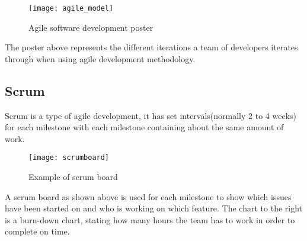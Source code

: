 \begin{figure}[!htpb]
\centering
	\texttt{[image: agile\_model]}
\caption{Agile software development poster}
\label{logo}
\end{figure}

The poster above represents the different iterations a team of developers iterates through when using agile development methodology.

\subsection{Scrum}
Scrum is a type of agile development, it has set intervals(normally 2 to 4 weeks) for each milestone with each milestone containing about the same amount of work.

\begin{figure}[!htpb]
\centering
	\texttt{[image: scrumboard]}
\caption{Example of scrum board}
\label{logo}
\end{figure}

A scrum board as shown above is used for each milestone to show which issues have been started on and who is working on which feature. The chart to the right is a burn-down chart, stating how many hours the team has to work in order to complete on time.